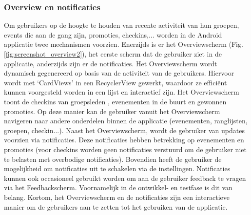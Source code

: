 \subsubsection{Overview en notificaties} %
Om gebruikers op de hoogte te houden van recente activiteit van hun groepen, events die aan de gang zijn, promoties, checkins,... worden in de Android applicatie twee mechanismen voorzien. 
Enerzijds is er het Overviewscherm (Fig. \ref{fig:screenshot_overview2}), het eerste scherm dat de gebruiker ziet in de applicatie, anderzijds zijn er de notificaties.
Het Overviewscherm wordt dynamisch gegenereerd op basis van de activiteit van de gebruikers. Hiervoor wordt met `CardViews' in een RecyclerView gewerkt, waardoor ze efficiënt kunnen voorgesteld worden in een lijst en interactief zijn. Het Overviewscherm toont de checkins van groepsleden , evenementen in de buurt en gewonnen promoties. Op deze manier kan de gebruiker vanuit het Overviewscherm navigeren naar andere onderdelen binnen de applicatie (evenementen, ranglijsten, groepen, checkin...).
Naast het Overviewscherm, wordt de gebruiker van updates voorzien via notificaties. Deze notificaties hebben betrekking op evenementen en promoties (voor checkins worden geen notificaties verstuurd om de gebruiker niet te belasten met overbodige notificaties). Bovendien heeft de gebruiker de mogelijkheid om notificaties uit te schakelen via de instellingen. Notificaties kunnen ook occasioneel gebruikt worden om aan de gebruiker feedback te vragen via het Feedbackscherm. Voornamelijk in de ontwikkel- en testfase is dit van belang.
Kortom, het Overviewscherm en de notificaties zijn een interactieve manier om de gebruikers aan te zetten tot het gebruiken van de applicatie.

